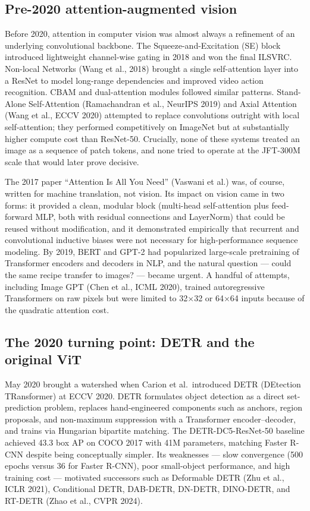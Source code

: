 \subsection{Pre-2020 attention-augmented vision}\label{pre-2020-attention-augmented-vision}

Before 2020, attention in computer vision was almost always a refinement of an underlying convolutional backbone. The Squeeze-and-Excitation (SE) block introduced lightweight channel-wise gating in 2018 and won the final ILSVRC. Non-local Networks (Wang et al., 2018) brought a single self-attention layer into a ResNet to model long-range dependencies and improved video action recognition. CBAM and dual-attention modules followed similar patterns. Stand-Alone Self-Attention (Ramachandran et al., NeurIPS 2019) and Axial Attention (Wang et al., ECCV 2020) attempted to replace convolutions outright with local self-attention; they performed competitively on ImageNet but at substantially higher compute cost than ResNet-50. Crucially, none of these systems treated an image as a sequence of patch tokens, and none tried to operate at the JFT-300M scale that would later prove decisive.

The 2017 paper ``Attention Is All You Need'' (Vaswani et al.) was, of course, written for machine translation, not vision. Its impact on vision came in two forms: it provided a clean, modular block (multi-head self-attention plus feed-forward MLP, both with residual connections and LayerNorm) that could be reused without modification, and it demonstrated empirically that recurrent and convolutional inductive biases were not necessary for high-performance sequence modeling. By 2019, BERT and GPT-2 had popularized large-scale pretraining of Transformer encoders and decoders in NLP, and the natural question --- could the same recipe transfer to images? --- became urgent. A handful of attempts, including Image GPT (Chen et al., ICML 2020), trained autoregressive Transformers on raw pixels but were limited to 32×32 or 64×64 inputs because of the quadratic attention cost.

\subsection{The 2020 turning point: DETR and the original ViT}\label{the-2020-turning-point-detr-and-the-original-vit}

May 2020 brought a watershed when Carion et al.~introduced DETR (DEtection TRansformer) at ECCV 2020. DETR formulates object detection as a direct set-prediction problem, replaces hand-engineered components such as anchors, region proposals, and non-maximum suppression with a Transformer encoder--decoder, and trains via Hungarian bipartite matching. The DETR-DC5-ResNet-50 baseline achieved 43.3 box AP on COCO 2017 with 41M parameters, matching Faster R-CNN despite being conceptually simpler. Its weaknesses --- slow convergence (500 epochs versus 36 for Faster R-CNN), poor small-object performance, and high training cost --- motivated successors such as Deformable DETR (Zhu et al., ICLR 2021), Conditional DETR, DAB-DETR, DN-DETR, DINO-DETR, and RT-DETR (Zhao et al., CVPR 2024).

